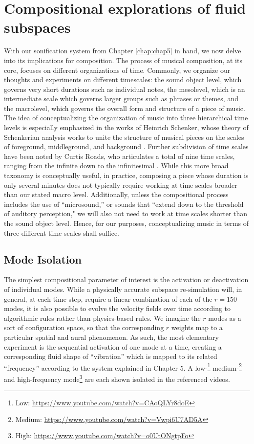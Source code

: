 \chapter[Compositional exploration of fluid subspaces]{Compositional explorations of fluid subspaces}
\label{chap:chap6}

With our sonification system from Chapter \ref{chap:chap5} in hand, we now delve into its implications for composition. The process of musical composition, at its core, focuses on different
organizations of time. Commonly, we organize our thoughts and experiments on different timescales: the sound object level, which governs very short durations such as individual notes, the mesolevel, which is an intermediate scale which governs larger groups such as phrases or themes, and the macrolevel, which governs the overall form and structure of a piece of music. The idea of conceptualizing the
organization of music into three hierarchical time levels is especially emphasized in the works of Heinrich Schenker, whose theory of Schenkerian analysis works to unite the structure of musical pieces on the scales of 
foreground, middleground, and background \cite{cadwallader2007analysis}. Further subdivision of time scales have been noted by Curtis Roads, who articulates a total of nine time scales, ranging from the infinite down to the infinitesimal \cite{roads2004microsound}. While this more broad taxonomy is conceptually useful, in practice, composing a piece whose duration is only several minutes does not typically require working at time scales broader than our stated macro level. Additionally, unless the compositional process includes the use of ``microsound,'' or sounds that ``extend down to the threshold of auditory perception," we will also not need to work at time scales shorter than the sound object level. Hence, for our purposes, conceptualizing music in terms of three different time scales shall suffice.

\section{Mode Isolation}
The simplest compositional parameter of interest is the activation or deactivation of individual modes. While a physically accurate subspace re-simulation will, in general, at each time step, require a linear combination of each of the $r = 150$ modes, it is also possible to evolve the velocity fields over time according to algorithmic rules rather than physics-based rules. We imagine the $r$ modes as a sort of configuration space, so that the corresponding $r$ weights map to a particular spatial and aural phenomenon. As such, the most elementary experiment is the sequential activation of one mode at a time, creating a corresponding fluid shape of ``vibration'' which is mapped to its related ``frequency'' according to the system explained in Chapter 5. A low-\footnote{Low: \url{https://www.youtube.com/watch?v=CAoQLYr8doE}}  medium-\footnote{Medium: \url{https://www.youtube.com/watch?v=Vwpi6U7AD5A}} and high-frequency mode\footnote{High: \url{https://www.youtube.com/watch?v=o0UtONgtpFo}} are each shown isolated in the referenced videos. 

